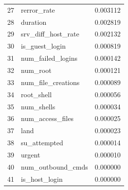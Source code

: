 \documentclass[12pt,a4paper]{report}
\begin{document}
\begin{longtable}{clc}
27 & rerror\_rate & 0.003112 \\
28 & duration & 0.002819 \\
29 & srv\_diff\_host\_rate & 0.002132 \\
30 & is\_guest\_login & 0.000819 \\
31 & num\_failed\_logins & 0.000142 \\
32 & num\_root & 0.000121 \\
33 & num\_file\_creations & 0.000089 \\
34 & root\_shell & 0.000056 \\
35 & num\_shells & 0.000034 \\
36 & num\_access\_files & 0.000025 \\
37 & land & 0.000023 \\
38 & su\_attempted & 0.000014 \\
39 & urgent & 0.000010 \\
40 & num\_outbound\_cmds & 0.000000 \\
41 & is\_host\_login & 0.000000 \\
\end{longtable}
\end{document}
